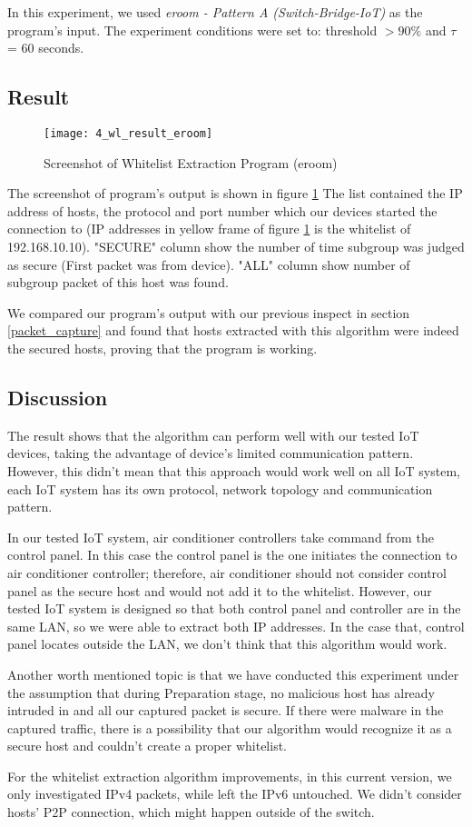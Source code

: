 In this experiment, we used \textit{eroom - Pattern A (Switch-Bridge-IoT)} as the program's input.
The experiment conditions were set to: threshold $>90\%$ and $\tau$ = 60 seconds.

\subsection{Result}

\begin{figure}[h]
    \centering 
    \texttt{[image: 4\_wl\_result\_eroom]}
    \caption{Screenshot of Whitelist Extraction Program (eroom)}
    \label{fig:s4_wl_result_eroom}
\end{figure}

The screenshot of program's output is shown in figure \ref{fig:s4_wl_result_eroom}
The list contained the IP address of hosts, the protocol and port number which our devices started the connection to (IP addresses in yellow frame of figure \ref{fig:s4_wl_result_eroom} is the whitelist of 192.168.10.10).
"SECURE" column show the number of time subgroup was judged as secure (First packet was from device).
"ALL" column show number of subgroup packet of this host was found.  

We compared our program's output with our previous inspect in section \ref{packet_capture} and found that
hosts extracted with this algorithm were indeed the secured hosts, proving that the program is working.  

\subsection{Discussion} 

The result shows that the algorithm can perform well with our tested IoT devices, taking the advantage of device's limited communication pattern. However, this didn’t mean that this approach would work well on all IoT system, each IoT system has its own protocol, network topology and communication pattern.  

In our tested IoT system, air conditioner controllers take command from the control panel. In this case the control panel is the one initiates the connection to air conditioner controller; therefore, air conditioner should not consider control panel as the secure host and would not add it to the whitelist. However, our tested IoT system is designed so that both control panel and controller are in the same LAN, so we were able to extract both IP addresses. In the case that, control panel locates outside the LAN, we don’t think that this algorithm would work. 

Another worth mentioned topic is that we have conducted this experiment under the assumption that during Preparation stage, no malicious host has already intruded in and all our captured packet is secure. If there were malware in the captured traffic, there is a possibility that our algorithm would recognize it as a secure host and couldn’t create a proper whitelist.   

For the whitelist extraction algorithm improvements, in this current version, we only investigated IPv4 packets, while left the IPv6 untouched. We didn’t consider hosts’ P2P connection, which might happen outside of the switch. 